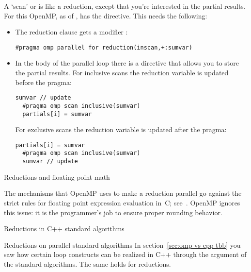 A `scan' or 
is like a reduction, except that you're interested
in the partial results.
For this OpenMP, as of , has the  directive.
This needs the following:
\begin{itemize}
\item The reduction clause gets a modifier :
\begin{lstlisting}[language=omp]
#pragma omp parallel for reduction(inscan,+:sumvar)
\end{lstlisting}
\item In the body of the parallel loop there is a  directive
  that allows you to store the partial results.
  For inclusive scans the reduction variable is updated before the  pragma:
\begin{lstlisting}[language=omp]
  sumvar // update
  #pragma omp scan inclusive(sumvar)
  partials[i] = sumvar
\end{lstlisting}
  For exclusive scans the reduction variable is updated after the  pragma:
\begin{lstlisting}[language=omp]
  partials[i] = sumvar
  #pragma omp scan inclusive(sumvar)
  sumvar // update
\end{lstlisting}
\end{itemize}


 {Reductions and floating-point math}

The mechanisms that OpenMP uses to make a reduction parallel go
against the strict rules for floating point expression evaluation in~C;
see~. OpenMP ignores this issue: it is the
programmer's job to ensure proper rounding behavior.


 {Reductions in C++ standard algorithms}

\begin{cppnote}{Reductions on parallel standard algorithms}
  In section~\ref{sec:omp-vs-cpp-tbb} you saw how certain loop constructs
  can be realized in C++ through the  argument
  of the standard algorithms. The same holds for reductions.
\end{cppnote}


